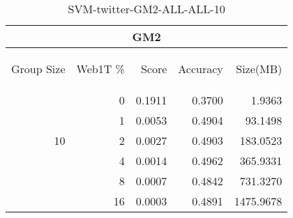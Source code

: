 \begin{center}
\begin{table}[htbp] 
 \begin{center}
\begin{tabular}{ | r | r | r | r | r |}
\hline
\multicolumn{5}{|c|}{GM2}\\
\hline
\begin{sideways}Group Size\end{sideways} & \begin{sideways}Web1T \%\end{sideways} & \begin{sideways}Score\end{sideways} & \begin{sideways}Accuracy\end{sideways} & \begin{sideways}Size(MB)\end{sideways}\\
\hline
\multirow{5}{*}{10}
 & 0 & 0.1911 & 0.3700 & 1.9363\\ \cline{2-5}
 & 1 & 0.0053 & 0.4904 & 93.1498\\ \cline{2-5}
 & 2 & 0.0027 & 0.4903 & 183.0523\\ \cline{2-5}
 & 4 & 0.0014 & 0.4962 & 365.9331\\ \cline{2-5}
 & 8 & 0.0007 & 0.4842 & 731.3270\\ \cline{2-5}
 & 16 & 0.0003 & 0.4891 & 1475.9678\\ \cline{2-5}
\hline
\end{tabular}
\caption{SVM-twitter-GM2-ALL-ALL-10}
\label{table:SVM-twitter-GM2-ALL-ALL-10}
\end{center}
 \end{table}
\end{center}

